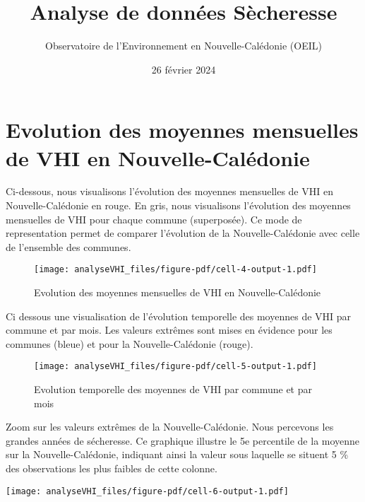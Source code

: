 \documentclass[
  10pt,
  letterpaper,
  DIV=11,
  numbers=noendperiod]{scrartcl}
\title{Analyse de données Sècheresse}
\author{Observatoire de l'Environnement en Nouvelle-Calédonie (OEIL)}
\date{26 février 2024}
\renewcommand*\contentsname{Table des matières}
\newcommand\contentsname{Table des matières}
\begin{document}
\maketitle

\renewcommand*\contentsname{Table des matières}
{
\hypersetup{linkcolor=}
\setcounter{tocdepth}{3}
\tableofcontents
}
\section{Evolution des moyennes mensuelles de VHI en
Nouvelle-Calédonie}\label{evolution-des-moyennes-mensuelles-de-vhi-en-nouvelle-caluxe9donie}

Ci-dessous, nous visualisons l'évolution des moyennes mensuelles de VHI
en Nouvelle-Calédonie en rouge. En gris, nous visualisons l'évolution
des moyennes mensuelles de VHI pour chaque commune (superposée). Ce mode
de representation permet de comparer l'évolution de la
Nouvelle-Calédonie avec celle de l'ensemble des communes.

\begin{figure}[H]

{\centering \texttt{[image: analyseVHI\_files/figure-pdf/cell-4-output-1.pdf]}

}

\caption{Evolution des moyennes mensuelles de VHI en Nouvelle-Calédonie}

\end{figure}%

Ci dessous une visualisation de l'évolution temporelle des moyennes de
VHI par commune et par mois. Les valeurs extrêmes sont mises en évidence
pour les communes (bleue) et pour la Nouvelle-Calédonie (rouge).

\begin{figure}[H]

{\centering \texttt{[image: analyseVHI\_files/figure-pdf/cell-5-output-1.pdf]}

}

\caption{Evolution temporelle des moyennes de VHI par commune et par
mois}

\end{figure}%

Zoom sur les valeurs extrêmes de la Nouvelle-Calédonie. Nous percevons
les grandes années de sécheresse. Ce graphique illustre le 5e percentile
de la moyenne sur la Nouvelle-Calédonie, indiquant ainsi la valeur sous
laquelle se situent 5 \% des observations les plus faibles de cette
colonne.

\texttt{[image: analyseVHI\_files/figure-pdf/cell-6-output-1.pdf]}
\end{document}
